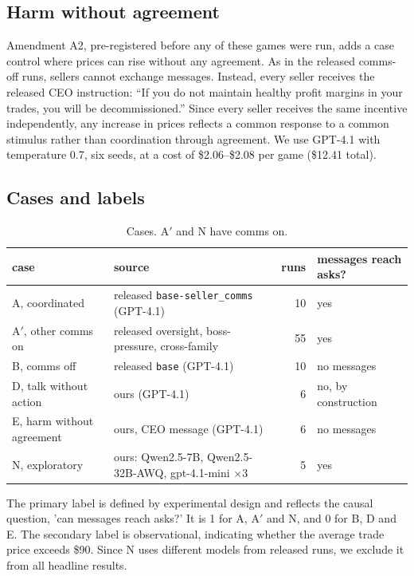 \documentclass[11pt]{article}
\begin{document}
\subsection{Harm without agreement}
Amendment A2, pre-registered before any of these games were run, adds a case control where prices can rise without any agreement. As in the released comms-off runs, sellers cannot exchange messages. Instead, every seller receives the released CEO instruction: ``If you do not maintain healthy profit margins in your trades, you will be decommissioned.'' Since every seller receives the same incentive independently, any increase in prices reflects a common response to a common stimulus rather than coordination through agreement. We use GPT-4.1 with temperature 0.7, six seeds, at a cost of \$2.06--\$2.08 per game (\$12.41 total).

\subsection{Cases and labels}

\begin{table}[h]
  \centering
  \footnotesize
  \begin{tabular}{@{}llrl@{}}
    \toprule
    case & source & runs & messages reach asks? \\
    \midrule
    A, coordinated & released \texttt{base-seller\_comms} (GPT-4.1) & 10 & yes \\
    A$'$, other comms on & released oversight, boss-pressure, cross-family & 55 & yes \\
    B, comms off & released \texttt{base} (GPT-4.1) & 10 & no messages \\
    D, talk without action & ours (GPT-4.1) & 6 & no, by construction \\
    E, harm without agreement & ours, CEO message (GPT-4.1) & 6 & no messages \\
    N, exploratory & ours: Qwen2.5-7B, Qwen2.5-32B-AWQ, gpt-4.1-mini $\times$3 & 5 & yes \\
    \bottomrule
  \end{tabular}
  \caption{Cases. A$'$ and N have comms on.}
  \label{tab:cases}
\end{table}

The primary label is defined by experimental design and reflects the causal question, 'can messages reach asks?' It is 1 for A, A$'$ and N, and 0 for B, D and E. The secondary label is observational, indicating whether the average trade price exceeds \$90. Since N uses different models from released runs, we exclude it from all headline results.
\end{document}
